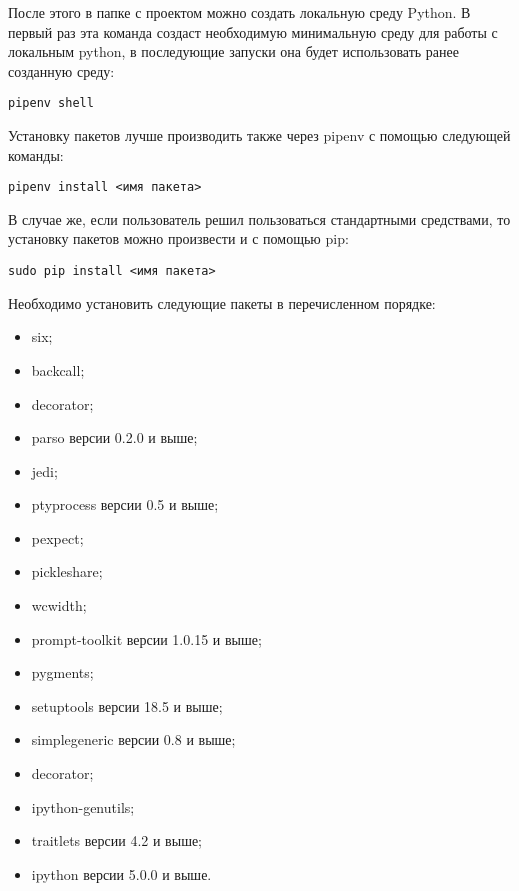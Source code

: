 После этого в папке с проектом можно создать локальную среду Python. В первый раз эта команда создаст необходимую минимальную среду для работы с локальным python, в последующие запуски она будет использовать ранее созданную среду:
\medskip
\begin{lstlisting}[style=Python]
  pipenv shell
\end{lstlisting}
\medskip

Установку пакетов лучше производить также через pipenv с помощью следующей команды:
\medskip
\begin{lstlisting}[style=Python]
  pipenv install <имя пакета>
\end{lstlisting}
\medskip

В случае же, если пользователь решил пользоваться стандартными средствами, то установку пакетов можно произвести и с помощью  pip:
\medskip
\begin{lstlisting}[style=Python]
  sudo pip install <имя пакета>
\end{lstlisting}
\medskip

Необходимо установить следующие пакеты в перечисленном порядке:
\begin{itemize}
\item six;
\item backcall;
\item decorator;
\item parso версии 0.2.0 и выше;
\item jedi;
\item ptyprocess версии 0.5 и выше;
\item pexpect;
\item pickleshare;
\item wcwidth;
\item prompt-toolkit версии 1.0.15 и выше;
\item pygments;
\item setuptools версии 18.5 и выше;
\item simplegeneric версии 0.8 и выше;
\item decorator;
\item ipython-genutils;
\item traitlets версии 4.2 и выше;
\item ipython версии 5.0.0 и выше.
\end{itemize}

